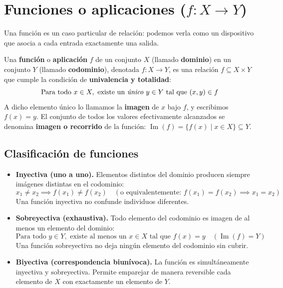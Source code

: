 \section{Funciones o aplicaciones (\texorpdfstring{$f: X \to Y$}{f: X -> Y})}

Una función es un caso particular de relación: podemos verla como un
dispositivo que asocia a cada entrada exactamente una salida. 

\begin{definicion}[Función]
Una \textbf{función} o \textbf{aplicación} $f$ de un conjunto $X$ (llamado \textbf{dominio}) en un conjunto $Y$ (llamado \textbf{codominio}), denotada $f: X \to Y$, es una relación $f \subseteq X \times Y$ que cumple la condición de \textbf{univalencia y totalidad}:
\[
\text{Para todo } x \in X, \text{ existe un \emph{único} } y \in Y \text{ tal que } (x, y) \in f
\]
A dicho elemento único lo llamamos la \textbf{imagen} de $x$ bajo $f$, y escribimos $f(x) = y$. El conjunto de todos los valores efectivamente alcanzados se denomina \textbf{imagen o recorrido} de la función: $\operatorname{Im}(f) = \{f(x) \mid x \in X\} \subseteq Y$.
\end{definicion}

\subsection{Clasificación de funciones}
\begin{itemize}
    \item \textbf{Inyectiva (uno a uno).} Elementos distintos del dominio producen siempre imágenes distintas en el codominio:
    \[
    x_1 \neq x_2 \implies f(x_1) \neq f(x_2) \quad (\text{o equivalentemente: } f(x_1) = f(x_2) \implies x_1 = x_2)
    \]
    Una función inyectiva no confunde individuos diferentes.

    \item \textbf{Sobreyectiva (exhaustiva).} Todo elemento del codominio es imagen de al menos un elemento del dominio:
    \[
    \text{Para todo } y \in Y, \text{ existe al menos un } x \in X \text{ tal que } f(x) = y \quad (\operatorname{Im}(f) = Y)
    \]
    Una función sobreyectiva no deja ningún elemento del codominio sin cubrir.

    \item \textbf{Biyectiva (correspondencia biunívoca).} La función es simultáneamente inyectiva y sobreyectiva. Permite emparejar de manera reversible cada elemento de $X$ con exactamente un elemento de $Y$.
\end{itemize}

